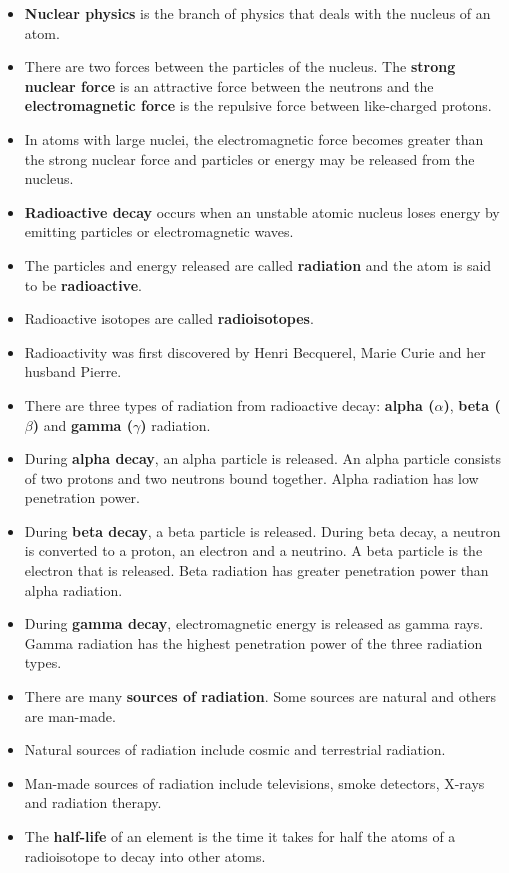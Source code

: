 \begin{itemize}
\item{\textbf{Nuclear physics} is the branch of physics that deals with the nucleus of an atom.}
\item{There are two forces between the particles of the nucleus. The \textbf{strong nuclear force} is an attractive force between the neutrons and the \textbf{electromagnetic force} is the repulsive force between like-charged protons.}
\item{In atoms with large nuclei, the electromagnetic force becomes greater than the strong nuclear force and particles or energy may be released from the nucleus.}
\item{\textbf{Radioactive decay} occurs when an unstable atomic nucleus loses energy by emitting particles or electromagnetic waves.}
\item{The particles and energy released are called \textbf{radiation} and the atom is said to be \textbf{radioactive}.}
\item{Radioactive isotopes are called \textbf{radioisotopes}.}
\item{Radioactivity was first discovered by Henri Becquerel, Marie Curie and her husband Pierre.}
\item{There are three types of radiation from radioactive decay: \textbf{alpha ($\alpha$)}, \textbf{beta ($\beta$)} and \textbf{gamma ($\gamma$)} radiation.}
\item{During \textbf{alpha decay}, an alpha particle is released. An alpha particle consists of two protons and two neutrons bound together. Alpha radiation has low penetration power.}
\item{During \textbf{beta decay}, a beta particle is released. During beta decay, a neutron is converted to a proton, an electron and a neutrino. A beta particle is the electron that is released. Beta radiation has greater penetration power than alpha radiation.}
\item{During \textbf{gamma decay}, electromagnetic energy is released as gamma rays. Gamma radiation has the highest penetration power of the three radiation types.}
\item{There are many \textbf{sources of radiation}. Some sources are natural and others are man-made.}
\item{Natural sources of radiation include cosmic and terrestrial radiation.}
\item{Man-made sources of radiation include televisions, smoke detectors, X-rays and radiation therapy.}
\item{The \textbf{half-life} of an element is the time it takes for half the atoms of a radioisotope to decay into other atoms.}

\end{itemize}
